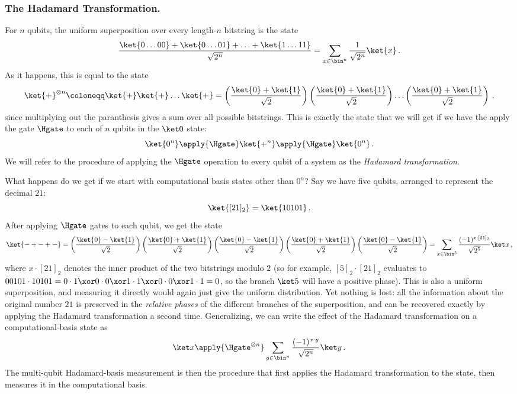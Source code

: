     \subsubsection{The Hadamard Transformation.}
      For $n$ qubits, the uniform superposition over every length-$n$ bitstring is the
      state
      \[
        \frac{\ket{0 \ldots 00}
        + \ket{0 \ldots 01} + \ldots + \ket{1 \ldots 11}}{\sqrt{2^n}}
        = 
        \sum_{x \in \bin^n} \frac{1}{\sqrt{2^n}}\ket{x}\, .
      \]
      As it happens, this is equal to the state
      \[
        \ket{+}^{\otimes n}
        \coloneqq 
        \ket{+}\ket{+} \ldots \ket{+} 
        = 
        \left( \frac{\ket{0} + \ket{1}}{\sqrt{2}} \right)
        \left( \frac{\ket{0} + \ket{1}}{\sqrt{2}} \right)
        \ldots
        \left( \frac{\ket{0} + \ket{1}}{\sqrt{2}} \right)\, ,
      \]
      since multiplying out the paranthesis gives a sum over all possible
      bitstrings. This is exactly the state that we will get if
      we have the apply the gate $\Hgate$ to each of $n$ qubits in the $\ket 0$
      state:
      \[
        \ket{0^n} \apply{\Hgate} \ket{+^n} \apply{\Hgate} \ket{0^n}\, .
      \]
      We will refer to the procedure of applying the $\Hgate$ operation to every
        qubit of a system as the \emph{Hadamard transformation}. 
      
      What happens do we get if we start with computational basis states other
        than $0^n$? Say we have five qubits, arranged to represent
        the decimal $21$:
        \[
          \ket{[21]_2} = \ket{10101}\, .
        \]
        After applying $\Hgate$ gates to each qubit, we get the state
        \[
          \ket{-+-+-} =
          \left( \frac{\ket{0} - \ket{1}}{\sqrt{2}} \right)
          \left( \frac{\ket{0} + \ket{1}}{\sqrt{2}} \right)
          \left( \frac{\ket{0} - \ket{1}}{\sqrt{2}} \right)
          \left( \frac{\ket{0} + \ket{1}}{\sqrt{2}} \right)
          \left( \frac{\ket{0} - \ket{1}}{\sqrt{2}} \right)
          = \sum_{x \in \bin^5} \frac{(-1)^{x \cdot [21]_2}}{\sqrt{2^5}} \ket x\, ,
        \]
        where $x \cdot [21]_2$ denotes the inner product of the two bitstrings
        modulo $2$ (so for example, $[5]_2 \cdot [21]_2$ evaluates to 
        $00101 \cdot 10101 = 0 \cdot 1 \xor 0 \cdot 0 \xor 1 \cdot 1 \xor 0
        \cdot 0 \xor 1 \cdot 1 = 0$, so the branch $\ket 5$ will have a positive phase).
        This is also a uniform superposition, and measuring it directly
        would again just give the uniform distribution. Yet nothing is lost: 
        all the information about the original number $21$ is preserved in
        the \emph{relative phases} of the different branches of the
        superposition, and can be recovered exactly by
        applying the Hadamard transformation a second time.
        Generalizing, we can write the effect of the Hadamard transformation on
        a computational-basis state as
        \[
          \ket x 
          \apply{\Hgate^{\otimes n}}
          \sum_{y \in \bin^n} \frac{(-1)^{x \cdot y}}{\sqrt{2^n}} \ket y\, .
        \]
      The multi-qubit Hadamard-basis measurement is then the procedure that
        first applies the Hadamard transformation to the state, then measures it
        in the computational basis.

